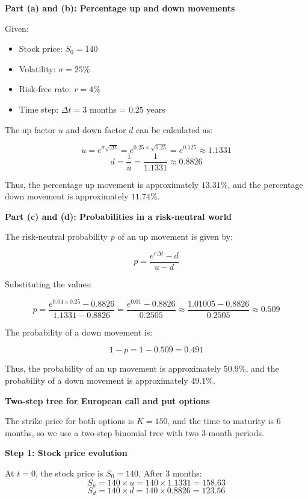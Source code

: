 \documentclass[12pt,letterpaper, onecolumn]{exam}
\begin{document}
\begin{solution}

\textbf{Part (a) and (b): Percentage up and down movements}

Given:
\begin{itemize}
    \item Stock price: \( S_0 = 140 \)
    \item Volatility: \( \sigma = 25\% \)
    \item Risk-free rate: \( r = 4\% \)
    \item Time step: \( \Delta t = 3 \) months = \( 0.25 \) years
\end{itemize}

The up factor \( u \) and down factor \( d \) can be calculated as:

\[
u = e^{\sigma \sqrt{\Delta t}} = e^{0.25 \times \sqrt{0.25}} = e^{0.125} \approx 1.1331
\]
\[
d = \frac{1}{u} = \frac{1}{1.1331} \approx 0.8826
\]

Thus, the percentage up movement is approximately \( 13.31\% \), and the percentage down movement is approximately \( 11.74\% \).

\textbf{Part (c) and (d): Probabilities in a risk-neutral world}

The risk-neutral probability \( p \) of an up movement is given by:

\[
p = \frac{e^{r \Delta t} - d}{u - d}
\]

Substituting the values:

\[
p = \frac{e^{0.04 \times 0.25} - 0.8826}{1.1331 - 0.8826} = \frac{e^{0.01} - 0.8826}{0.2505} \approx \frac{1.01005 - 0.8826}{0.2505} \approx 0.509
\]

The probability of a down movement is:

\[
1 - p = 1 - 0.509 = 0.491
\]

Thus, the probability of an up movement is approximately \( 50.9\% \), and the probability of a down movement is approximately \( 49.1\% \).

\textbf{Two-step tree for European call and put options}

The strike price for both options is \( K = 150 \), and the time to maturity is 6 months, so we use a two-step binomial tree with two 3-month periods.

\textbf{Step 1: Stock price evolution}

At \( t = 0 \), the stock price is \( S_0 = 140 \). After 3 months:
\[
S_u = 140 \times u = 140 \times 1.1331 = 158.63
\]
\[
S_d = 140 \times d = 140 \times 0.8826 = 123.56
\]


\end{solution}
\end{document}
